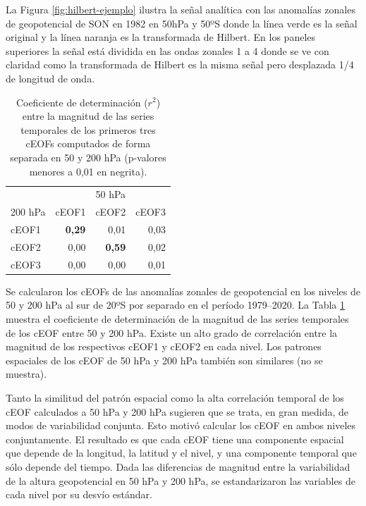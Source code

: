 \documentclass[12pt,oneside,a4paper]{reedthesis}
\begin{document}
La Figura \ref{fig:hilbert-ejemplo} ilustra la señal analítica con las anomalías zonales de geopotencial de SON en 1982 en 50hPa y 50ºS donde la línea verde es la señal original y la línea naranja es la transformada de Hilbert.
En los paneles superiores la señal está dividida en las ondas zonales 1 a 4 donde se ve con claridad como la transformada de Hilbert es la misma señal pero desplazada 1/4 de longitud de onda.



\begin{table}

\caption{\label{tab:corr-ceof-splitted}Coeficiente de determinación (\(r^2\)) entre la magnitud de las series temporales de los primeros tres cEOFs computados de forma separada en 50 y 200 hPa (p-valores menores a 0,01 en negrita).}
\centering
\begin{tabular}[t]{l>{}r>{}r>{}r}
\toprule
\multicolumn{1}{c}{} & \multicolumn{3}{c}{50 hPa} \\
\cmidrule(l{3pt}r{3pt}){2-4}
200 hPa & cEOF1 & cEOF2 & cEOF3\\
\midrule
cEOF1 & \textbf{0,29} & 0,01 & 0,03\\
cEOF2 & 0,00 & \textbf{0,59} & 0,02\\
cEOF3 & 0,00 & 0,00 & 0,01\\
\bottomrule
\end{tabular}
\end{table}

Se calcularon los cEOFs de las anomalías zonales de geopotencial en los niveles de 50 y 200 hPa al sur de 20ºS por separado en el período 1979--2020.
La Tabla \ref{tab:corr-ceof-splitted} muestra el coeficiente de determinación de la magnitud de las series temporales de los cEOF entre 50 y 200 hPa.
Existe un alto grado de correlación entre la magnitud de los respectivos cEOF1 y cEOF2 en cada nivel.
Los patrones espaciales de los cEOF de 50 hPa y 200 hPa también son similares (no se muestra).

Tanto la similitud del patrón espacial como la alta correlación temporal de los cEOF calculados a 50 hPa y 200 hPa sugieren que se trata, en gran medida, de modos de variabilidad conjunta.
Esto motivó calcular los cEOF en ambos niveles conjuntamente.
El resultado es que cada cEOF tiene una componente espacial que depende de la longitud, la latitud y el nivel, y una componente temporal que sólo depende del tiempo.
Dada las diferencias de magnitud entre la variabilidad de la altura geopotencial en 50 hPa y 200 hPa, se estandarizaron las variables de cada nivel por su desvío estándar.
\end{document}
